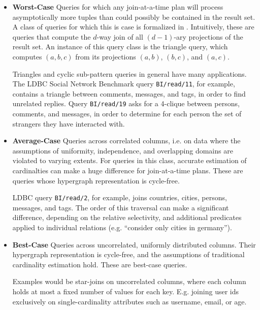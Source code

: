 \documentclass[../catalog.tex]{subfiles}
\begin{document}
\begin{itemize}

  \item \textbf{Worst-Case} Queries for which any join-at-a-time plan
    will process asymptotically more tuples than could possibly be
    contained in the result set. A class of queries for which this is
    case is formalized in \cite{ngo2012worst}. Intuitively, these are
    queries that compute the $d$-way join of all $(d-1)$-ary
    projections of the result set. An instance of this query class is
    the triangle query, which computes $(a,b,c)$ from its projections
    $(a,b)$, $(b,c)$, and $(a,c)$.

    Triangles and cyclic sub-pattern queries in general have many
    applications. The LDBC Social Network Benchmark query
    \texttt{BI/read/11}, for example, contains a triangle between
    comments, messages, and tags, in order to find unrelated
    replies. Query \texttt{BI/read/19} asks for a 4-clique between
    persons, comments, and messages, in order to determine for each
    person the set of strangers they have interacted with.

  \item \textbf{Average-Case} Queries across correlated columns,
    i.e. on data where the assumptions of uniformity, independence,
    and overlapping domains are violated to varying extents. For
    queries in this class, accurate estimation of cardinalties can
    make a huge difference for join-at-a-time plans. These are queries
    whose hypergraph representation is cycle-free.

    LDBC query \texttt{BI/read/2}, for example, joins countries,
    cities, persons, messages, and tags. The order of this traversal
    can make a significant difference, depending on the relative
    selectivity, and additional predicates applied to individual
    relations (e.g. ``consider only cities in germany'').

  \item \textbf{Best-Case} Queries across uncorrelated, uniformly
    distributed columns. Their hypergraph representation is
    cycle-free, and the assumptions of traditional cardinality
    estimation hold. These are best-case queries.

    Examples would be star-joins on uncorrelated columns, where each
    column holds at most a fixed number of values for each
    key. E.g. joining user ids exclusively on single-cardinality
    attributes such as username, email, or age.
    
\end{itemize}
\end{document}
